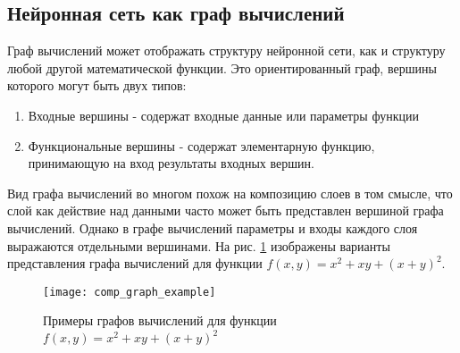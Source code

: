 \subsection{Нейронная сеть как граф вычислений}
Граф вычислений может отображать структуру нейронной сети, как и структуру любой другой математической функции. Это ориентированный граф, вершины которого могут быть двух типов:
\begin{enumerate}
	\item Входные вершины - содержат входные данные или параметры функции
	\item Функциональные вершины - содержат элементарную функцию, принимающую на вход результаты входных вершин. 
\end{enumerate}
\par
Вид графа вычислений во многом похож на композицию слоев в том смысле, что слой как действие над данными часто может быть представлен вершиной графа вычислений. Однако в графе вычислений параметры и входы каждого слоя выражаются отдельными вершинами. На рис. \ref{hist:vgg16arch} изображены варианты представления графа вычислений для функции $f(x,y)=x^2+xy+(x+y)^2$.
\begin{figure}[H]
	\centering
	\texttt{[image: comp\_graph\_example]}
	\caption{Примеры графов вычислений для функции $f(x,y)=x^2+xy+(x+y)^2$}
	\label{hist:vgg16arch}
\end{figure}
